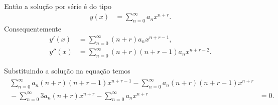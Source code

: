 \documentclass[a4paper,12pt, leqno, answers]{exam}
\begin{document}
\begin{questions}
\begin{solution}
        Ent\~{a}o a solu\c{c}\~{a}o por s\'{e}rie \'{e} do tipo
        \begin{align*}
            y(x) &= \sum_{n = 0}^\infty a_n x^{n + r}.
        \end{align*}
        Consequentemente
        \begin{align*}
            y'(x) &= \sum_{n = 0}^\infty \left( n + r \right) a_n x^{n + r - 1}, \\
            y''(x) &= \sum_{n = 0}^\infty \left( n + r \right) \left( n + r - 1 \right) a_n x^{n + r - 2}.
        \end{align*}
        
        Substituindo a solu\c{c}\~{a}o na equa\c{c}\~{a}o temos
        \begin{align*}
            \begin{split}
                \sum_{n = 0}^\infty a_n \left( n + r \right) \left( n + r - 1 \right) x^{n + r - 1} - \sum_{n = 0}^\infty a_n \left( n + r \right) \left( n + r - 1 \right) x^{n + r} & \\ {}- \sum_{n = 0}^\infty 3 a_n \left( n + r \right) x^{n + r} - \sum_{n = 0}^\infty a_n x^{n + r} &= 0.
            \end{split}
        \end{align*}
    \end{solution}


\end{questions}
\end{document}
